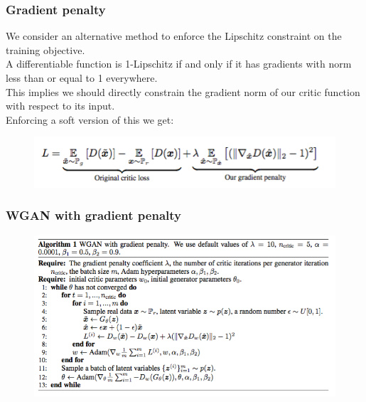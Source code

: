 \documentclass{beamer}
\begin{document}
\begin{frame}
\frametitle{Gradient penalty}
\pause
We consider an alternative method to enforce the Lipschitz constraint on the training objective.\\
\vspace{0.12in}
\pause
A differentiable function is 1-Lipschitz if and only if it has gradients with norm less than or equal to 1 everywhere. \\
\vspace{0.12in}
\pause
This implies we should directly constrain the gradient norm of our critic function with respect to its input. \\
\vspace{0.12in}
\pause
Enforcing a soft version of this we get:

\begin{figure}
\centering
\includegraphics[width=1\textwidth]{penalty.png}
\end{figure}

\end{frame}

\begin{frame}
\frametitle{WGAN with gradient penalty}
\begin{figure}
\centering
\includegraphics[width=1.07\textwidth]{i_wgan.png}
\end{figure}
\end{frame}
\end{document}
